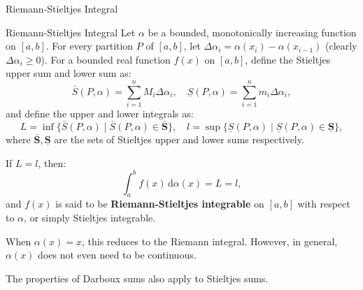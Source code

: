 \documentclass[11pt]{../../TexTemplate/elegantbook}
\begin{document}
\begin{leftbarTitle}{Riemann-Stieltjes Integral}\end{leftbarTitle}
\begin{definition}{Riemann-Stieltjes Integral}
    Let \( \alpha \) be a bounded, monotonically increasing function on \( [a, b] \). 
    For every partition \( P \) of \( [a, b] \), let \( \Delta \alpha_i = \alpha(x_i) - \alpha(x_{i-1}) \) 
    (clearly \( \Delta \alpha_i \geqslant 0 \)).
    For a bounded real function \( f(x) \) on \( [a, b] \), define the Stieltjes upper sum and lower sum as:  
    \[
    \bar{S}(P, \alpha) = \sum_{i=1}^n M_i \Delta \alpha_i, \quad \underline{S}(P, \alpha) = \sum_{i=1}^n m_i \Delta \alpha_i,
    \]  
    and define the upper and lower integrals as:  
    \[
    L = \inf\{ \bar{S}(P, \alpha) \mid \bar{S}(P, \alpha) \in \boldsymbol{\bar{S}} \}, \quad l = \sup\{ \underline{S}(P, \alpha) \mid \underline{S}(P, \alpha) \in \boldsymbol{\underline{S}} \},
    \]  
    where \( \boldsymbol{\bar{S}, \underline{S}} \) are the sets of Stieltjes upper and lower sums respectively.

    If \( L = l \), then:  
    \[
    \int_{a}^b f(x) \, \mathrm{d}\alpha(x) = L = l,
    \]  
    and \( f(x) \) is said to be \textbf{Riemann-Stieltjes integrable} on \( [a, b] \) with respect to \( \alpha \), 
    or simply Stieltjes integrable.
\end{definition}

When \( \alpha(x) = x \), this reduces to the Riemann integral. 
However, in general, \( \alpha(x) \) does not even need to be continuous.

The properties of Darboux sums also apply to Stieltjes sums.
\end{document}
